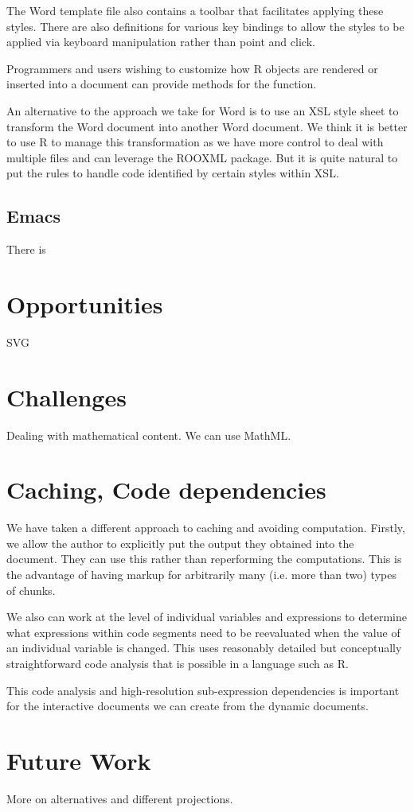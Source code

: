 \documentclass{article}
\begin{document}
The Word template file also contains a toolbar that facilitates
applying these styles.  There are also definitions for various key
bindings to allow the styles to be applied via keyboard manipulation
rather than point and click.

Programmers and users wishing to customize how R objects are rendered
or inserted into a document can provide methods for the
 function.

An alternative to the approach we take for Word is to use an XSL style
sheet to transform the Word document into another Word document. We
think it is better to use R to manage this transformation as we have
more control to deal with multiple files and can leverage the ROOXML
package. But it is quite natural to put the rules to handle
code identified by certain styles within XSL.


\subsection{Emacs}
There is 
\section{Opportunities}
SVG

\section{Challenges}

Dealing with mathematical content. We can use MathML.

\section{Caching, Code dependencies}
We have taken a different approach to caching and avoiding
computation.  Firstly, we allow the author to explicitly put the
output they obtained into the document.  They can use this rather than
reperforming the computations.  This is the advantage of having markup
for arbitrarily many (i.e. more than two) types of chunks.

We also can work at the level of individual variables and expressions
to determine what expressions within code segments need to be
reevaluated when the value of an individual variable is changed.  This
uses reasonably detailed but conceptually straightforward code
analysis that is possible in a language such as R.

This code analysis and high-resolution sub-expression dependencies is
important for the interactive documents we can create from the dynamic
documents.

\section{Future Work}
More on alternatives and different projections.
\end{document}
